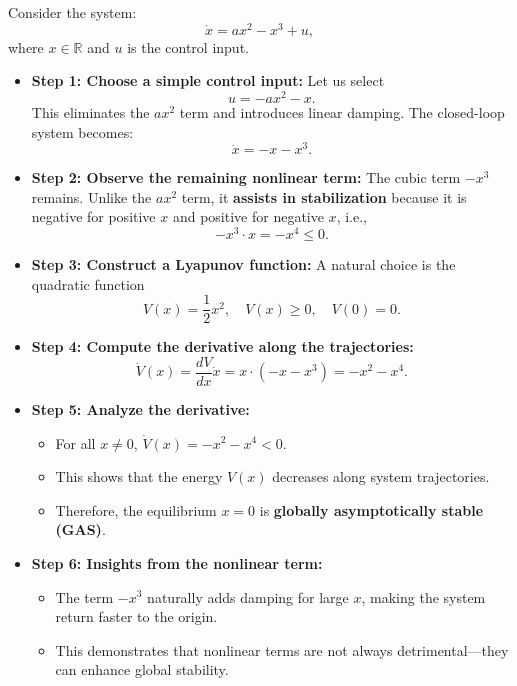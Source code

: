 \begin{example}
Consider the system:
\[
\dot{x} = a x^2 - x^3 + u,
\]
where \(x \in \mathbb{R}\) and \(u\) is the control input.  

\begin{itemize}
    \item \textbf{Step 1: Choose a simple control input:}  
    Let us select
    \[
    u = - a x^2 - x.
    \]
    This eliminates the \(a x^2\) term and introduces linear damping. The closed-loop system becomes:
    \[
    \dot{x} = - x - x^3.
    \]

    \item \textbf{Step 2: Observe the remaining nonlinear term:}  
    The cubic term \(-x^3\) remains. Unlike the \(a x^2\) term, it \textbf{assists in stabilization} because it is negative for positive \(x\) and positive for negative \(x\), i.e.,
    \[
    -x^3 \cdot x = -x^4 \le 0.
    \]

    \item \textbf{Step 3: Construct a Lyapunov function:}  
    A natural choice is the quadratic function
    \[
    V(x) = \frac{1}{2} x^2, \quad V(x) \ge 0, \quad V(0)=0.
    \]

    \item \textbf{Step 4: Compute the derivative along the trajectories:}  
    \[
    \dot{V}(x) = \frac{dV}{dx} \dot{x} = x \cdot (-x - x^3) = -x^2 - x^4.
    \]

    \item \textbf{Step 5: Analyze the derivative:}  
    \begin{itemize}
        \item For all \(x \neq 0\), \(\dot{V}(x) = -x^2 - x^4 < 0\).  
        \item This shows that the energy \(V(x)\) decreases along system trajectories.  
        \item Therefore, the equilibrium \(x=0\) is \textbf{globally asymptotically stable (GAS)}.
    \end{itemize}

    \item \textbf{Step 6: Insights from the nonlinear term:}  
    \begin{itemize}
        \item The term \(-x^3\) naturally adds damping for large \(x\), making the system return faster to the origin.  
        \item This demonstrates that nonlinear terms are not always detrimental—they can enhance global stability.  
    \end{itemize}
\end{itemize}
\end{example}

